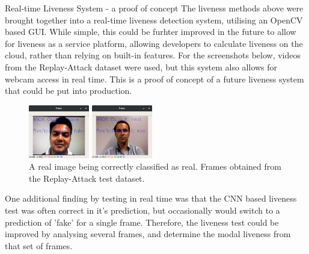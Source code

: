 \documentclass[final]{beamer}
\begin{document}
\begin{frame}{}
\begin{columns}[t]
\begin{column}{.48\linewidth}
     


        \begin{block}{Real-time Liveness System - a proof of concept}
          The liveness methods above were brought together into a real-time liveness detection system, utilising an OpenCV based GUI.
          While simple, this could be furhter improved in the future to allow for liveness as a service platform, allowing developers to calculate liveness on the cloud,
          rather than relying on built-in features. For the screenshots below, videos from the Replay-Attack dataset were used, but this system also allows for webcam access in real time.
          This is a proof of concept of a future liveness system that could be put into production.

          \begin{figure}[!tbp]
            \centering
            \begin{minipage}[b]{0.3\textwidth}
              \centering
              \includegraphics[width=100px]{FakeOutputAndCorrect.png}
              \caption{A spoofed image being correctly classified as fake by both liveness tests. Frames obtained from the Replay-Attack test dataset.}
            \end{minipage}
            \begin{minipage}[b]{0.3\textwidth}
              \centering
              \includegraphics[width=100px]{BothRealAndCorrect.png}
            \caption{A real image being correctly classified as real. Frames obtained from the Replay-Attack test dataset.}
            \end{minipage}
          \end{figure}
          
          One additional finding by testing in real time was that the CNN based liveness test was often correct in it's prediction, but occasionally would
          switch to a prediction of 'fake' for a single frame. Therefore, the liveness test could be improved by analysing several frames, and determine the modal liveness from that set of frames.
          

\end{block}
\end{column}
\end{columns}
\end{frame}
\end{document}
